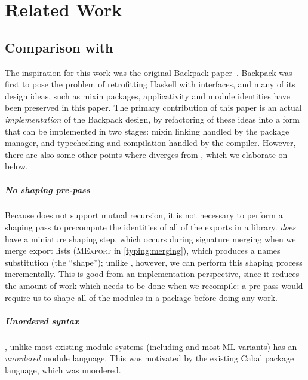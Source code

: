 \chapter{Related Work}

\section{Comparison with \OldBackpack{}}

The inspiration for this
work was the original Backpack paper~\cite{backpack}.  Backpack was
first to pose the problem of retrofitting Haskell with interfaces, and
many of its design ideas, such as mixin packages, applicativity and
module identities have been preserved in this paper.  The primary contribution
of this paper is an actual \emph{implementation} of the
Backpack design, by refactoring of these ideas into a form that can be
implemented in two stages: mixin linking handled by the package manager,
and typechecking and compilation handled by the compiler.  However,
there are also some other points where \Backpack{} diverges from
\OldBackpack{}, which we elaborate on below.

\paragraph{No shaping pre-pass}

Because \Backpack{} does not support mutual recursion, it is not
necessary to perform a shaping pass to precompute the identities of all
of the exports in a library.  \Backpack{} \emph{does} have a miniature
shaping step, which occurs during signature merging when we merge export
lists (\textsc{MExport} in \cref{typing:merging}), which
produces a names substitution (the ``shape''); unlike \OldBackpack{},
however, we can perform this
shaping process incrementally.  This is good from an implementation
perspective, since it reduces the amount of work which needs to be done
when we recompile: a pre-pass would require us to shape all of the modules
in a package before doing any work.

\paragraph{Unordered syntax}

\Backpack{}, unlike most existing module systems (including \OldBackpack{}
and most ML variants) has an \emph{unordered} module language.  This was
motivated by the existing Cabal package language, which was unordered.

